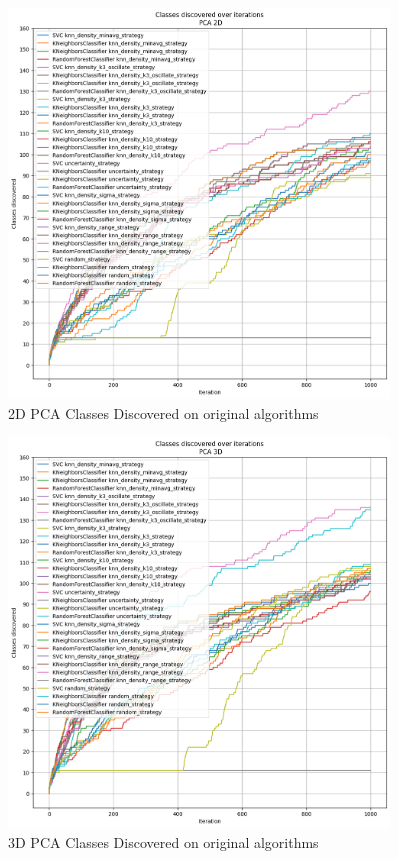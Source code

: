 \begin{figure}[htbp]
    \centering
    \includegraphics[width=0.9\textwidth]{resources/images/classes_discovered_pca_2d.png}
    \caption{2D PCA Classes Discovered on original algorithms}
\end{figure}

\begin{figure}[htbp]
    \centering
    \includegraphics[width=0.9\textwidth]{resources/images/classes_discovered_pca_3d.png}
    \caption{3D PCA Classes Discovered on original algorithms}
\end{figure}


